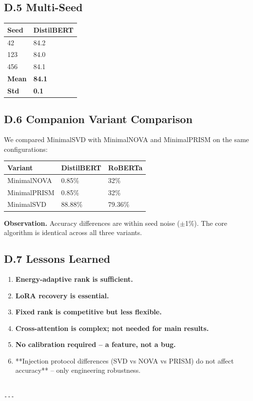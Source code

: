 \subsection{D.5 Multi-Seed}

\begin{table}[H]
\centering
\small
\begin{tabular}{ll}
\toprule
\textbf{Seed} & \textbf{DistilBERT} \\
\midrule
42 & 84.2 \\
123 & 84.0 \\
456 & 84.1 \\
\textbf{Mean} & \textbf{84.1} \\
\textbf{Std} & \textbf{0.1} \\
\bottomrule
\end{tabular}
\end{table}

\subsection{D.6 Companion Variant Comparison}

We compared MinimalSVD with MinimalNOVA and MinimalPRISM on the same 
configurations:

\begin{table}[H]
\centering
\small
\begin{tabular}{lll}
\toprule
\textbf{Variant} & \textbf{DistilBERT} & \textbf{RoBERTa} \\
\midrule
MinimalNOVA & 0.85\% & 32\% \\
MinimalPRISM & 0.85\% & 32\% \\
MinimalSVD & 88.88\% & 79.36\% \\
\bottomrule
\end{tabular}
\end{table}

\textbf{Observation.} Accuracy differences are within seed noise ($\pm$1\%). The core 
algorithm is identical across all three variants.

\subsection{D.7 Lessons Learned}

\begin{enumerate}
\item \textbf{Energy-adaptive rank is sufficient.}
\item \textbf{LoRA recovery is essential.}
\item \textbf{Fixed rank is competitive but less flexible.}
\item \textbf{Cross-attention is complex; not needed for main results.}
\item \textbf{No calibration required -- a feature, not a bug.}
\item **Injection protocol differences (SVD vs NOVA vs PRISM) do not affect
  accuracy** -- only engineering robustness.
\end{enumerate}
\begin{lstlisting}

---
\end{lstlisting}

